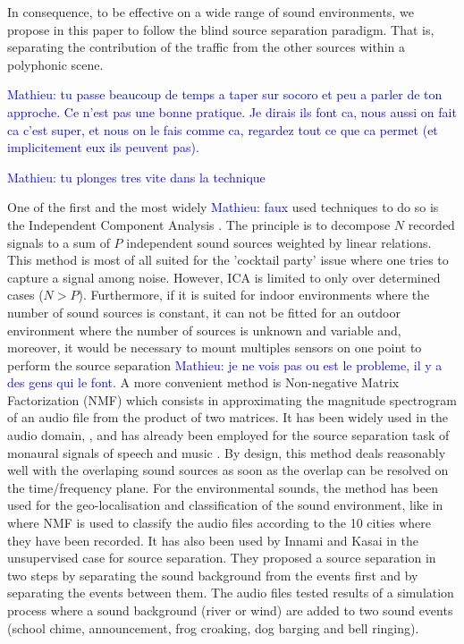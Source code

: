\documentclass[twocolumn,a4paper,10pt]{article}
\newcommand{\ml}[1]{\textcolor{blue}{ Mathieu: #1}}
\begin{document}
In consequence, to be effective on a wide range of sound environments, we propose in this paper to follow the blind source separation paradigm. That is, separating the contribution of the traffic from the other sources within a polyphonic scene.

\ml{tu passe beaucoup de temps a taper sur socoro et peu a parler de ton approche. Ce n'est pas une bonne pratique. Je dirais ils font ca, nous aussi on fait ca c'est super, et nous on le fais comme ca, regardez tout ce que ca permet (et implicitement eux ils peuvent pas).}

\ml{tu plonges tres vite dans la technique}

One of the first and the most widely \ml{faux} used techniques to do so is the Independent Component Analysis \cite{comon_independent_1994}. The principle is to decompose $N$ recorded signals to a sum of $P$ independent sound sources weighted by linear relations. This method is most of all suited for the 'cocktail party' issue where one tries to capture a signal among noise.  However, ICA is limited to only over determined cases ($N > P$). Furthermore, if it is suited for indoor environments where the number of sound sources is constant, it can not be fitted for an outdoor environment where the number of sources is unknown and variable and, moreover, it would be necessary to mount multiples sensors on one point to perform the source separation \ml{je ne vois pas ou est le probleme, il y a des gens qui le font}. A more convenient method is Non-negative Matrix Factorization (NMF) \cite{lee_learning_1999} which consists in approximating the magnitude spectrogram of an audio file from the product of two matrices. It has been widely used in the audio domain, \cite{smaragdis_non-negative_2003} \cite{wilson_speech_2008} \cite{mesaros_sound_2015}, and has already been employed for the source separation task of monaural signals of speech and music \cite{wang_musical_2005} \cite{wilson_speech_2008}. By design, this method deals reasonably well with the overlaping sound sources as soon as the overlap can be resolved on the time/frequency plane. For the environmental sounds, the method has been used for the geo-localisation and classification of the sound environment, like in \cite{kumar_audio_2016} where NMF is used to classify the audio files according to the 10 cities where they have been recorded. It has also been used by Innami and Kasai in the unsupervised case \cite{satoshi_innami_nmf-based_2012} for source separation. They proposed a source separation in two steps by separating the sound background from the events first and by separating the events between them. The audio files tested results of a simulation process where a sound background (river or wind) are added to two sound events (school chime, announcement, frog croaking, dog barging and bell ringing).
\end{document}
